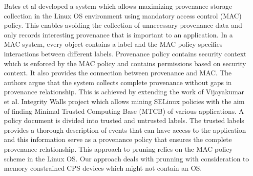 Bates et al \cite{Bates:2015:TOY:2814579.2814586} developed a system which allows maximizing provenance storage collection in the Linux OS environment using mandatory access control (MAC) policy. This enables avoiding the collection of unnecessary provenance data and only records interesting provenance that is important to an application. In a MAC system, every object contains a label and the MAC policy specifies interactions between different labels. Provenance policy contains security context which is enforced by the MAC policy and contains permissions based on security context. It also provides the connection between provenance and MAC. The authors argue that the system collects complete provenance without gaps in provenance relationship. This is achieved by extending the work of Vijayakumar et al. \cite{asiaccs12-vijayakumar} Integrity Walls project which allows mining SELinux policies with the aim of finding Minimal Trusted Computing Base (MTCB) of various applications. A policy document is divided into trusted and untrusted labels. The trusted labels provides a thorough description of events that can have access to the application and this information serve as a provenance policy that ensures the complete provenance relationship. This approach to pruning relies on the MAC policy scheme in the Linux OS. Our approach deals with prunning with consideration to memory constrained CPS devices which might not contain an OS. 

%

